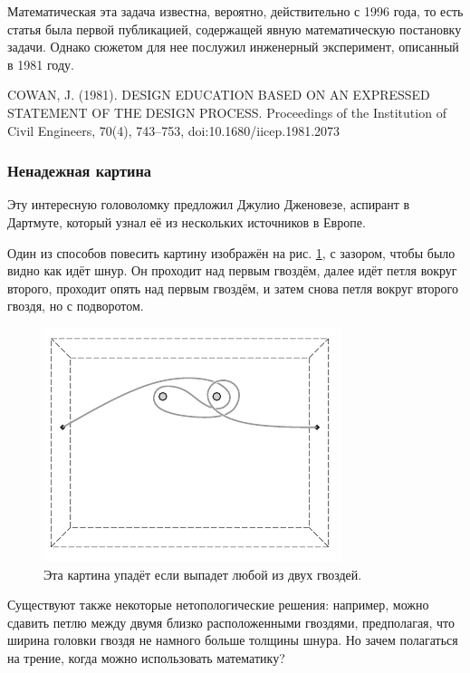 \begin{addedbytheeditors}
    Математическая эта задача известна, вероятно, действительно с 1996 года, то есть статья \cite{42} была первой 
    публикацией, содержащей явную математическую постановку задачи. 
    Однако сюжетом для нее послужил инженерный эксперимент, описанный в 1981 году.

COWAN, J. (1981). DESIGN EDUCATION BASED ON AN EXPRESSED STATEMENT OF THE DESIGN PROCESS. Proceedings of the Institution of Civil Engineers, 70(4), 743–753, doi:10.1680/iicep.1981.2073
    
\end{addedbytheeditors}

\subsubsection*{Ненадежная картина}

Эту интересную головоломку предложил Джулио Дженовезе, аспирант в Дартмуте, который узнал её из нескольких источников в Европе.

Один из способов повесить картину изображён на рис. \ref{pic:kartina2}, с зазором, чтобы было видно как идёт шнур.
Он проходит над первым гвоздём, далее идёт петля вокруг второго,
проходит опять над первым гвоздём, и затем снова петля вокруг второго гвоздя, но с подворотом.

\begin{figure}[h!]
\centering
\includegraphics[scale=1]{pics/kartina2}
\caption{Эта картина упадёт если выпадет любой из двух гвоздей.}
\label{pic:kartina2}
\end{figure}

Существуют также некоторые нетопологические решения: например, можно сдавить петлю между двумя близко расположенными гвоздями, предполагая, что ширина головки гвоздя не намного больше толщины шнура.
Но зачем полагаться на трение, когда можно использовать математику?

